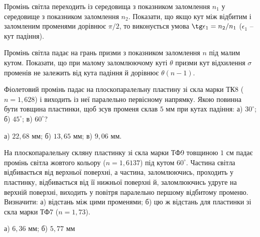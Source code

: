 \begin{problem}
    Промінь світла переходить із середовища з показником заломлення $n_1$
    у середовище з показником заломлення $n_2$. Показати, що якщо кут між
    відбитим і заломленим променями дорівнює $\pi/2$, то виконується умова $\tg \epsilon_1 = n_2/n_1$ ($\epsilon_1$ -- кут падіння).
\end{problem}

\begin{problem}
Промінь світла падає на грань призми з показником заломлення $n$ під
малим кутом. Показати, що при малому заломлюючому куті $\theta$ призми
кут відхилення $\sigma$ променів не залежить від кута падіння й дорівнює
$\theta (n - 1)$.
\end{problem}

\begin{problem}
Фіолетовий промінь падає на плоскопаралельну пластину зі скла
марки ТК8 ($n = 1,628$) і виходить із неї паралельно первісному
напрямку. Якою повинна бути товщина пластинки, щоб зсув променя
склав $5$ мм при кутах падіння: а) $30^\circ$; б) $45^\circ$; в) $60^\circ$?
\begin{solution}
	а) $22,68$ мм; б) $13,65$ мм; в) $9,06$ мм.
\end{solution}
\end{problem}

\begin{problem}
На плоскопаралельну скляну пластинку зі скла марки ТФ9 товщиною
$1$ см падає промінь світла жовтого кольору ($n = 1,6137$) під кутом $60^\circ$.
Частина світла відбивається від верхньої поверхні, а частина,
заломлюючись, проходить у пластинку, відбивається від її нижньої
поверхні й, заломлюючись удруге на верхній поверхні, виходить у
повітря паралельно першому відбитому променю. Визначити: а)
відстань між цими променями; б) цю ж відстань для пластинки зі скла
марки ТФ7 ($n = 1,73$).
\begin{solution}
	а) $6,36$ мм; б) $5,77$ мм
\end{solution}
\end{problem}

